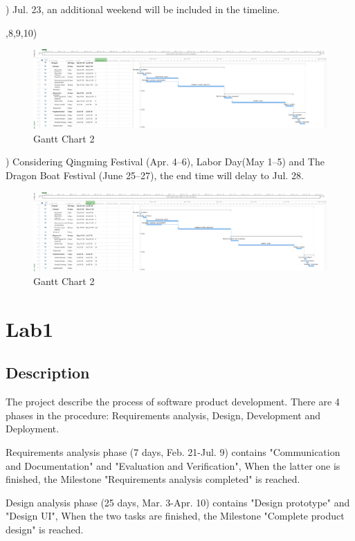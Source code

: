 \documentclass[runningheads]{llncs}
\begin{document}
) Jul. 23, an additional weekend will be included in the timeline.

,8,9,10) 
\begin{figure}[H]
    \centering
    \includegraphics[width=1.0\textwidth]{./image/proj2}
    \caption{Gantt Chart 2}
\end{figure}

) Considering Qingming Festival (Apr. 4–6), Labor Day(May 1–5) and The Dragon Boat Festival (June 25–27), the end time will delay to Jul. 28.
\begin{figure}[H]
    \centering
    \includegraphics[width=1.0\textwidth]{./image/proj3}
    \caption{Gantt Chart 2}
\end{figure}


\section{Lab1}
\subsection{Description}

The project describe the process of software product development. There are 4 phases in the procedure: Requirements analysis, Design, Development and Deployment. 

\noindent Requirements analysis phase (7 days, Feb. 21-Jul. 9) contains "Communication and Documentation" and "Evaluation and Verification", When the latter one is finished, the Milestone "Requirements analysis completed" is reached.

\noindent Design analysis phase (25 days, Mar. 3-Apr. 10) contains "Design prototype" and "Design UI", When the two tasks are finished, the Milestone "Complete product design" is reached.
\end{document}
